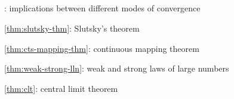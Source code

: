 \subsection*{}
\item {}: implications between different modes of convergence
\item \cref{thm:slutsky-thm}: Slutsky's theorem
\item \cref{thm:cts-mapping-thm}: continuous mapping theorem
\item \cref{thm:weak-strong-lln}: weak and strong laws of large numbers
\item \cref{thm:clt}: central limit theorem
